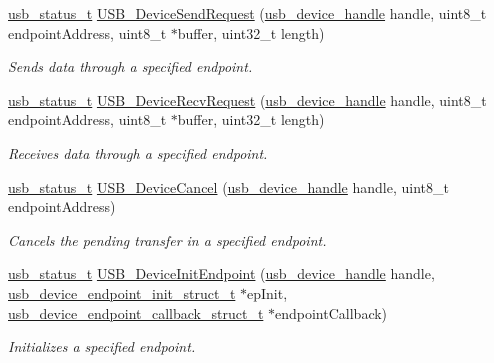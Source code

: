 \begin{DoxyCompactItemize}
\hyperlink{group__usb__drv_ga3172b9f50553fb6d8aa2823d10a39c58}{usb\-\_\-status\-\_\-t} \hyperlink{group__usb__device__driver_ga94f95f6b9e0ba1caba7ea7c889a4b471}{U\-S\-B\-\_\-\-Device\-Send\-Request} (\hyperlink{group__usb__drv_gae62132dc6e5eba994f8aa56cb7399abc}{usb\-\_\-device\-\_\-handle} handle, uint8\-\_\-t endpoint\-Address, uint8\-\_\-t $\ast$buffer, uint32\-\_\-t length)
\begin{DoxyCompactList}\small\item\em Sends data through a specified endpoint. \end{DoxyCompactList}\item 
\hyperlink{group__usb__drv_ga3172b9f50553fb6d8aa2823d10a39c58}{usb\-\_\-status\-\_\-t} \hyperlink{group__usb__device__driver_gaafd44df38db0494a5c7a53c91b08eef7}{U\-S\-B\-\_\-\-Device\-Recv\-Request} (\hyperlink{group__usb__drv_gae62132dc6e5eba994f8aa56cb7399abc}{usb\-\_\-device\-\_\-handle} handle, uint8\-\_\-t endpoint\-Address, uint8\-\_\-t $\ast$buffer, uint32\-\_\-t length)
\begin{DoxyCompactList}\small\item\em Receives data through a specified endpoint. \end{DoxyCompactList}\item 
\hyperlink{group__usb__drv_ga3172b9f50553fb6d8aa2823d10a39c58}{usb\-\_\-status\-\_\-t} \hyperlink{group__usb__device__driver_gaa95120c01a49916790852c8ac8468ec3}{U\-S\-B\-\_\-\-Device\-Cancel} (\hyperlink{group__usb__drv_gae62132dc6e5eba994f8aa56cb7399abc}{usb\-\_\-device\-\_\-handle} handle, uint8\-\_\-t endpoint\-Address)
\begin{DoxyCompactList}\small\item\em Cancels the pending transfer in a specified endpoint. \end{DoxyCompactList}\item 
\hyperlink{group__usb__drv_ga3172b9f50553fb6d8aa2823d10a39c58}{usb\-\_\-status\-\_\-t} \hyperlink{group__usb__device__driver_ga3302bb97cb7e4a0a805f8dec3cabd07f}{U\-S\-B\-\_\-\-Device\-Init\-Endpoint} (\hyperlink{group__usb__drv_gae62132dc6e5eba994f8aa56cb7399abc}{usb\-\_\-device\-\_\-handle} handle, \hyperlink{group__usb__device__driver_ga5fd6342aa2c5f10ba177604031b38d99}{usb\-\_\-device\-\_\-endpoint\-\_\-init\-\_\-struct\-\_\-t} $\ast$ep\-Init, \hyperlink{group__usb__device__driver_ga0fcee893200ced24dbff370f38c16573}{usb\-\_\-device\-\_\-endpoint\-\_\-callback\-\_\-struct\-\_\-t} $\ast$endpoint\-Callback)
\begin{DoxyCompactList}\small\item\em Initializes a specified endpoint. \end{DoxyCompactList}\item 

\end{DoxyCompactItemize}
